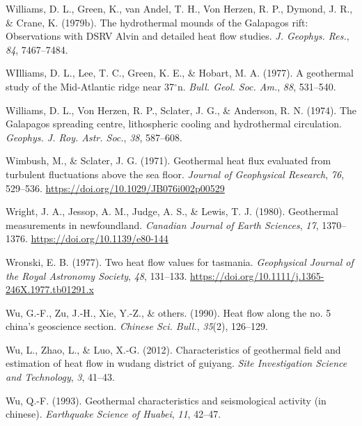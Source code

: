 \documentclass[draft,linenumbers]{agujournal2018}
\begin{document}
\leavevmode{}%
Williams, D. L., Green, K., van Andel, T. H., Von Herzen, R. P., Dymond,
J. R., \& Crane, K. (1979b). The hydrothermal mounds of the {Galapagos}
rift: Observations with {DSRV Alvin} and detailed heat flow studies.
\emph{J. Geophys. Res.}, \emph{84}, 7467--7484.

\leavevmode{}%
WIlliams, D. L., Lee, T. C., Green, K. E., \& Hobart, M. A. (1977). A
geothermal study of the {Mid-Atlantic} ridge near 37\(^\circ\)n.
\emph{Bull. Geol. Soc. Am.}, \emph{88}, 531--540.

\leavevmode{}%
Williams, D. L., Von Herzen, R. P., Sclater, J. G., \& Anderson, R. N.
(1974). The {Galapagos} spreading centre, lithospheric cooling and
hydrothermal circulation. \emph{Geophys. J. Roy. Astr. Soc.}, \emph{38},
587--608.

\leavevmode{}%
Wimbush, M., \& Sclater, J. G. (1971). Geothermal heat flux evaluated
from turbulent fluctuations above the sea floor. \emph{Journal of
Geophysical Research}, \emph{76}, 529--536.
\url{https://doi.org/10.1029/JB076i002p00529}

\leavevmode{}%
Wright, J. A., Jessop, A. M., Judge, A. S., \& Lewis, T. J. (1980).
Geothermal measurements in newfoundland. \emph{Canadian Journal of Earth
Sciences}, \emph{17}, 1370--1376. \url{https://doi.org/10.1139/e80-144}

\leavevmode{}%
Wronski, E. B. (1977). Two heat flow values for tasmania.
\emph{Geophysical Journal of the Royal Astronomy Society}, \emph{48},
131--133. \url{https://doi.org/10.1111/j.1365-246X.1977.tb01291.x}

\leavevmode{}%
Wu, G.-F., Zu, J.-H., Xie, Y.-Z., \& others. (1990). Heat flow along the
no. 5 china's geoscience section. \emph{Chinese Sci. Bull.},
\emph{35}(2), 126--129.

\leavevmode{}%
Wu, L., Zhao, L., \& Luo, X.-G. (2012). Characteristics of geothermal
field and estimation of heat flow in wudang district of guiyang.
\emph{Site Investigation Science and Technology}, \emph{3}, 41--43.

\leavevmode{}%
Wu, Q.-F. (1993). Geothermal characteristics and seismological activity
(in chinese). \emph{Earthquake Science of Huabei}, \emph{11}, 42--47.
\end{document}
